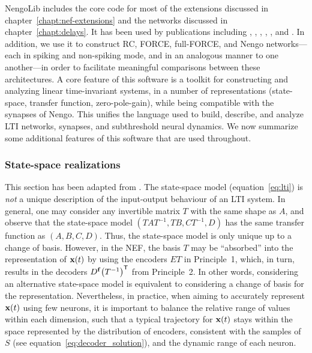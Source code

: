 
NengoLib includes the core code for most of the extensions discussed in chapter~\ref{chapt:nef-extensions} and the networks discussed in chapter~\ref{chapt:delays}.
It has been used by publications including
\citet{knight2016}, \citet{voelker2016a}, \citet{voelker2017iscas}, \citet{voelker2017neuromorphic}, \citet{voelker2018}, and \citet{neckar2018braindrop}.
In addition, we use it to construct RC, FORCE, full-FORCE, and Nengo networks---each in spiking and non-spiking mode, and in an analogous manner to one another---in order to facilitate meaningful comparisons between these architectures.
A core feature of this software is a toolkit for constructing and analyzing linear time-invariant systems, in a number of representations (state-space, transfer function, zero-pole-gain), while being compatible with the synapses of Nengo.
This unifies the language used to build, describe, and analyze LTI networks, synapses, and subthreshold neural dynamics.
We now summarize some additional features of this software that are used throughout.

\subsubsection{State-space realizations}

This section has been adapted from \citet[][appendix~A.3]{voelker2018}.
The state-space model (equation~\ref{eq:lti}) is \emph{not} a unique description of the input-output behaviour of an LTI system.
In general, one may consider any invertible matrix $T$ with the same shape as $A$, and observe that the state-space model $(TAT^{-1}\text{,}\, TB\text{,}\, CT^{-1}\text{,}\, D)$ has the same transfer function as $(A\text{,}\, B\text{,}\, C\text{,}\, D)$.
Thus, the state-space model is only unique up to a change of basis.
However, in the NEF, the basis $T$ may be ``absorbed'' into the representation of $\mathbf{x}(t)$ by using the encoders $ET$ in Principle~1, which, in turn, results in the decoders $D^{\mathbf{f}} {\left(T^{-1}\right)}^\mathsf{T}$ from Principle~2.
In other words, considering an alternative state-space model is equivalent to considering a change of basis for the representation.
Nevertheless, in practice, when aiming to accurately represent $\mathbf{x}(t)$ using few neurons, it is important to balance the relative range of values within each dimension, such that a typical trajectory for $\mathbf{x}(t)$ stays within the space represented by the distribution of encoders, consistent with the samples of $S$ (see equation~\ref{eq:decoder_solution}), and the dynamic range of each neuron.

